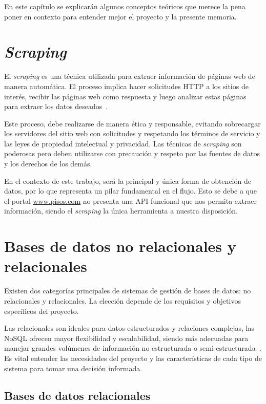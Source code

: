 
En este capítulo se explicarán algunos conceptos teóricos que merece la pena poner en contexto para entender mejor el proyecto y la presente memoria.

\section{\textit{Scraping}}

El \textit{scraping} es una técnica utilizada para extraer información de páginas web de manera automática. El proceso implica hacer solicitudes HTTP a los sitios de interés, recibir las páginas web como respuesta y luego analizar estas páginas para extraer los datos deseados~\cite{khder2021}. 

Este proceso, debe realizarse de manera ética y responsable, evitando sobrecargar los servidores del sitio web con solicitudes y respetando los términos de servicio y las leyes de propiedad intelectual y privacidad. Las técnicas de \textit{scraping} son poderosas pero deben utilizarse con precaución y respeto por las fuentes de datos y los derechos de los demás.

En el contexto de este trabajo, será la principal y única forma de obtención de datos, por lo que representa un pilar fundamental en el flujo. Esto se debe a que el portal \url{www.pisos.com} no presenta una API funcional que nos permita extraer información, siendo el \textit{scraping} la única herramienta a nuestra disposición.



\section{Bases de datos no relacionales y relacionales}

Existen dos categorías principales de sistemas de gestión de bases de datos: no relacionales y relacionales. La elección depende de los requisitos y objetivos específicos del proyecto. 

Las relacionales son ideales para datos estructurados y relaciones complejas, las NoSQL ofrecen mayor flexibilidad y escalabilidad, siendo más adecuadas para manejar grandes volúmenes de información no estructurada o semi-estructurada~\cite{leavitt2010}. Es vital entender las necesidades del proyecto y las características de cada tipo de sistema para tomar una decisión informada. 

\subsection{Bases de datos relacionales}

